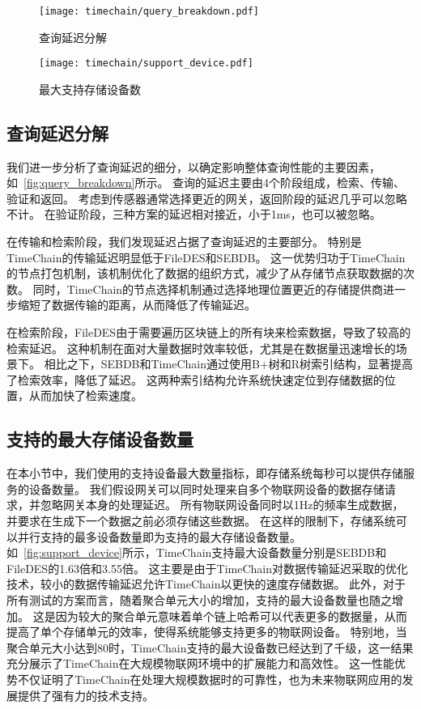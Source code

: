 \begin{figure*}[t]
    \centering
    \begin{minipage}{0.48\linewidth}
        \centering
        \texttt{[image: timechain/query\_breakdown.pdf]}
        \caption{查询延迟分解}
        \label{fig:query_breakdown}
	\end{minipage}
	\quad
	\begin{minipage}{0.48\linewidth}
        \centering
        \texttt{[image: timechain/support\_device.pdf]}
        \caption{最大支持存储设备数}
        \label{fig:support_device}
    \end{minipage}
\end{figure*}

\subsection{查询延迟分解}
我们进一步分析了查询延迟的细分，以确定影响整体查询性能的主要因素，如~\autoref{fig:query_breakdown}所示。
查询的延迟主要由4个阶段组成，检索、传输、验证和返回。
考虑到传感器通常选择更近的网关，返回阶段的延迟几乎可以忽略不计。
在验证阶段，三种方案的延迟相对接近，小于1ms，也可以被忽略。

在传输和检索阶段，我们发现延迟占据了查询延迟的主要部分。
特别是TimeChain的传输延迟明显低于FileDES和SEBDB。
这一优势归功于TimeChain的节点打包机制，该机制优化了数据的组织方式，减少了从存储节点获取数据的次数。
同时，TimeChain的节点选择机制通过选择地理位置更近的存储提供商进一步缩短了数据传输的距离，从而降低了传输延迟。

在检索阶段，FileDES由于需要遍历区块链上的所有块来检索数据，导致了较高的检索延迟。
这种机制在面对大量数据时效率较低，尤其是在数据量迅速增长的场景下。
相比之下，SEBDB和TimeChain通过使用B+树和R树索引结构，显著提高了检索效率，降低了延迟。
这两种索引结构允许系统快速定位到存储数据的位置，从而加快了检索速度。

\subsection{支持的最大存储设备数量}
在本小节中，我们使用的支持设备最大数量指标，即存储系统每秒可以提供存储服务的设备数量。
我们假设网关可以同时处理来自多个物联网设备的数据存储请求，并忽略网关本身的处理延迟。
所有物联网设备同时以1Hz的频率生成数据，并要求在生成下一个数据之前必须存储这些数据。
在这样的限制下，存储系统可以并行支持的最多设备数量即为支持的最大存储设备数量。
如~\autoref{fig:support_device}所示，TimeChain支持最大设备数量分别是SEBDB和FileDES的1.63倍和3.55倍。
这主要是由于TimeChain对数据传输延迟采取的优化技术，较小的数据传输延迟允许TimeChain以更快的速度存储数据。
此外，对于所有测试的方案而言，随着聚合单元大小的增加，支持的最大设备数量也随之增加。
这是因为较大的聚合单元意味着单个链上哈希可以代表更多的数据量，从而提高了单个存储单元的效率，使得系统能够支持更多的物联网设备。
特别地，当聚合单元大小达到80时，TimeChain支持的最大设备数已经达到了千级，这一结果充分展示了TimeChain在大规模物联网环境中的扩展能力和高效性。
这一性能优势不仅证明了TimeChain在处理大规模数据时的可靠性，也为未来物联网应用的发展提供了强有力的技术支持。

